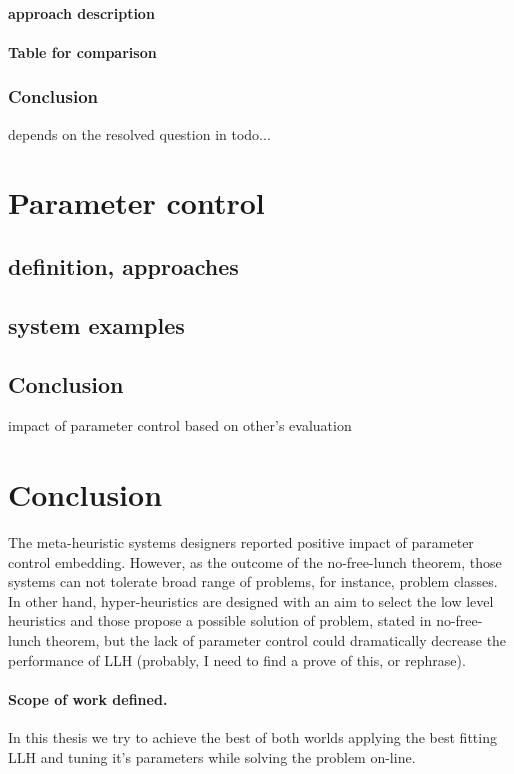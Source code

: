 \paragraph{approach description}


\paragraph{Table for comparison}

\subsubsection{Conclusion}
depends on the resolved question in todo...


\section{Parameter control}\label{bg: parameter control}
\subsection{definition, approaches}
\subsection{system examples}
\subsection{Conclusion} impact of parameter control based on other's evaluation


\section{Conclusion}

The meta-heuristic systems designers reported positive impact of parameter control embedding. 
However, as the outcome of the no-free-lunch theorem, those systems can not tolerate broad range of problems, for instance, problem classes.
In other hand, hyper-heuristics are designed with an aim to select the low level heuristics and those propose a possible solution of problem, stated in no-free-lunch theorem, but the lack of parameter control could dramatically decrease the performance of LLH (probably, I need to find a prove of this, or rephrase).

\paragraph{Scope of work defined.} In this thesis we try to achieve the best of both worlds applying the best fitting LLH and tuning it's parameters while solving the problem on-line.
